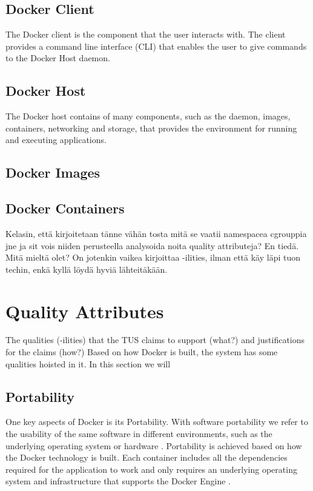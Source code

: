 \documentclass[fleqn,12pt]{olplainarticle}
\begin{document}
\subsection*{Docker Client}

The Docker client is the component that the user interacts with. The client provides a command line interface (CLI) that enables the user to give commands to the Docker Host daemon.

\subsection*{Docker Host}

The Docker host contains of many components, such as the daemon, images, containers, networking and storage, that provides the environment for running and executing applications. 


\subsection*{Docker Images}

\subsection*{Docker Containers}

Kelasin, että kirjoitetaan tänne vähän tosta mitä se vaatii namespacea cgrouppia jne ja sit vois niiden perusteella analysoida noita quality attributeja? En tiedä. Mitä mieltä olet? On jotenkin vaikea kirjoittaa -ilities, ilman että käy läpi tuon techin, enkä kyllä löydä hyviä lähteitäkään. 

\section*{Quality Attributes}

The qualities (-ilities) that the TUS claims to support (what?) and justifications for the claims (how?)
Based on how Docker is built, the system has some qualities hoisted in it. In this section we will 

\subsection*{Portability}
One key aspects of Docker is its Portability. With software portability we refer to the usability of the same software in different environments, such as the underlying operating system or hardware \citep{wiki:Software_portability}. Portability is achieved based on how the Docker technology is built. Each container includes all the dependencies required for the application to work and only requires an underlying operating system and infrastructure that supports the Docker Engine \citep{hy:DevOps_with_Docker}.
\end{document}
